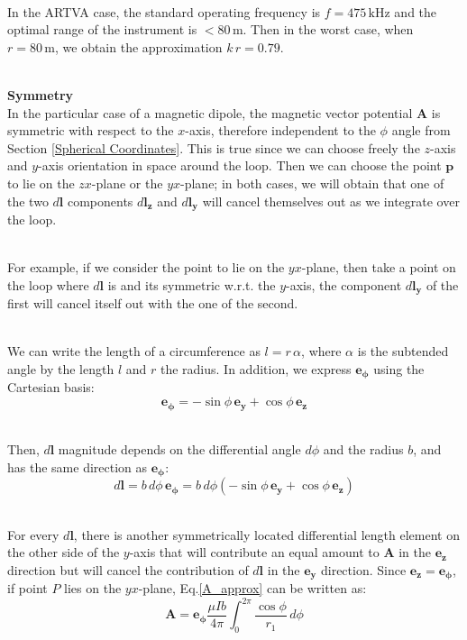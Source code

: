 \documentclass[main]{subfiles}
\begin{document}
\noindent\\
In the ARTVA case, the standard operating frequency 
is \( f = 475 \, \text{kHz} \) and the optimal range 
of the instrument is \( <80 \, \text{m} \). Then in 
the worst case, when \( r = 80 \, \text{m} \), we 
obtain the approximation \( k \, r = 0.79 \).

\noindent\\
\textbf{Symmetry}\noindent\\
In the particular case of a magnetic dipole, the 
magnetic vector potential $\mathbf{A}$ is symmetric 
with respect to the \(x\)-axis, therefore independent 
to the $\phi$ angle from Section \ref{Spherical Coordinates}. 
This is true since we can choose freely the $z$-axis 
and $y$-axis orientation in space around the loop. 
Then we can choose the point $\mathbf{p}$ to lie on 
the $zx$-plane or the $yx$-plane; in both cases, we 
will obtain that one of the two $d\mathbf{l}$ 
components $d\mathbf{l_z}$ and $d\mathbf{l_y}$ will 
cancel themselves out as we integrate over the loop.

\noindent\\
For example, if we consider the point to lie on the 
$yx$-plane, then take a point on the loop where 
$d\mathbf{l}$ is and its symmetric w.r.t. the 
$y$-axis, the component $d\mathbf{l_y}$ of the first 
will cancel itself out with the one of the second.

\noindent\\
We can write the length of a circumference as 
$l = r \, \alpha$, where $\alpha$ is the subtended 
angle by the length $l$ and $r$ the radius. In 
addition, we express $\mathbf{e_\phi}$ using the 
Cartesian basis:
$$
 \mathbf{e_\phi} = - \sin\phi \, \mathbf{e_y} 
 + \cos\phi \, \mathbf{e_z}
$$

\noindent\\
Then, $d\mathbf{l}$ magnitude depends on the 
differential angle $d\phi$ and the radius $b$, and 
has the same direction as $\mathbf{e_\phi}$:
\begin{equation}
 d\mathbf{l} = b \, d\phi \, \mathbf{e_\phi} 
 = b \, d\phi \left(- \sin\phi \, \mathbf{e_y} 
 + \cos\phi \, \mathbf{e_z}\right)
    \label{eq:dl}
\end{equation}

\noindent\\
For every $d\mathbf{l}$, there is another 
symmetrically located differential length element on 
the other side of the $y$-axis that will contribute 
an equal amount to $\mathbf{A}$ in the $\mathbf{e_z}$ 
direction but will cancel the contribution of 
$d\mathbf{l}$ in the $\mathbf{e_y}$ direction. 
Since $\mathbf{e_z} = \mathbf{e_\phi}$, if point $P$ 
lies on the $yx$-plane, Eq.\ref{A_approx} can 
be written as:
\begin{equation}
 \mathbf{A} = \mathbf{e_\phi} \frac{\mu I b}{4 \pi} 
    \int_{0}^{2\pi} \frac{\cos \phi}{r_1} \, d\phi
    \label{eq:A_final}
\end{equation}
\end{document}

